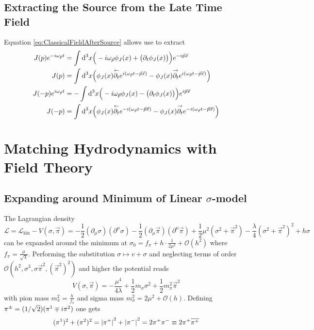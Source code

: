 \subsection{Extracting the Source from the Late Time Field}

Equation \eqref{eq:ClassicalFieldAfterSource} allows use to extract
\begin{subequations}
    \begin{align}        
        J(p)e^{-{i}\omega_{\vec{p}}t}&=\int\text{d}^3x\Big(-{i}\omega_{\vec{p}}\phi_J(x)+\big(\partial_t\phi_J(x)\big)\Big)e^{-{i}\vec{p}\vec{x}}\\
        J(p)&=\int\text{d}^3x\Big(\phi_J(x)\overset{\leftarrow}{\partial_t}e^{{i}(\omega_{\vec{p}}t-\vec{p}\vec{x})}-\phi_J(x)\overset{\rightarrow}{\partial_t}e^{{i}(\omega_{\vec{p}}t-\vec{p}\vec{x})}\Big)\\
        J(-p)e^{{i}\omega_{\vec{p}}t}&=-\int\text{d}^3x\Big(-{i}\omega_{\vec{p}}\phi_J(x)-\big(\partial_t\phi_J(x)\big)\Big)e^{{i}\vec{p}\vec{x}}\\
        J(-p)&=\int\text{d}^3x\Big(\phi_J(x)\overset{\leftarrow}{\partial_t}e^{-{i}(\omega_{\vec{p}}t-\vec{p}\vec{x})}-\phi_J(x)\overset{\rightarrow}{\partial_t}e^{-{i}(\omega_{\vec{p}}t-\vec{p}\vec{x})}\Big)
    \end{align}
    \label{eq:SourceFieldRelation}
\end{subequations} 

\section{Matching Hydrodynamics with Field Theory}

\subsection{Expanding around Minimum of Linear $\sigma$-model}

The Lagrangian density
\begin{equation}
    \mathscr{L}=\mathcal{L}_{\text{kin}}-V(\sigma,\vec{\pi})=-\frac{1}{2}(\partial_\mu\sigma)(\partial^\mu\sigma)-\frac{1}{2}(\partial_\mu\vec{\pi})(\partial^\mu\vec{\pi})+\frac{1}{2}\mu^2(\sigma^2+\vec{\pi}^2)-\frac{\lambda}{4}(\sigma^2+\vec{\pi}^2)^2+h\sigma
    \label{eq:LinearSigmaModelLagrangian}
\end{equation}
can be expanded around the minimum at $\sigma_0=f_\pi+h\cdot\frac{1}{2\mu^2}+\mathcal{O}(h^2)$ where $f_\pi=\frac{\mu}{\sqrt{\lambda}}$. Performing the substitution $\sigma\mapsto v+\sigma$ and neglecting terms of order $\mathcal{O}(h^2,\sigma^3,\sigma\vec{\pi}^2,(\vec{\pi}^2)^2)$ and higher the potential reads
\begin{equation}
    V(\sigma,\vec{\pi})=-\frac{\mu^4}{4\lambda}+\frac{1}{2}m_\sigma\sigma^2+\frac{1}{2}m_\pi^2\vec{\pi}^2
\end{equation}
with pion mass $m_\pi^2=\frac{h}{f_\pi}$ and sigma mass $m_\sigma^2=2\mu^2+\mathcal{O}(h)$. Defining $\pi^\pm=(1/\sqrt{2})(\pi^1\mp{i}\pi^2)$ one gets 
\begin{equation}
    (\pi^1)^2+(\pi^2)^2={\vert\pi^+\vert}^2+{\vert\pi^-\vert}^2=2\pi^+\pi^-\equiv 2\pi^+\overline{\pi^+}
\end{equation}

